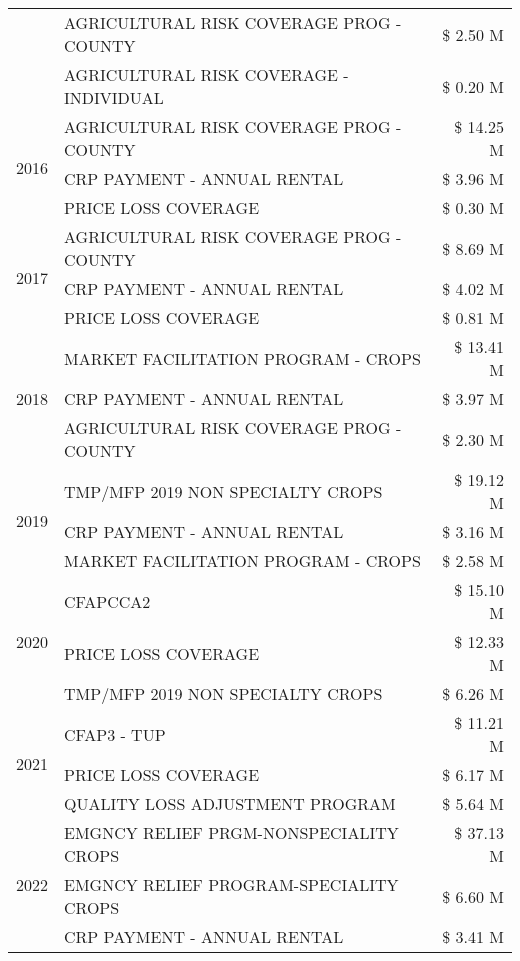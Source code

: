 \begin{tabular}{llr}
 & AGRICULTURAL RISK COVERAGE PROG - COUNTY & \$ 2.50 M \\
 & AGRICULTURAL RISK COVERAGE - INDIVIDUAL & \$ 0.20 M \\
\cline{1-3}
\multirow[t]{3}{*}{2016} & AGRICULTURAL RISK COVERAGE PROG - COUNTY & \$ 14.25 M \\
 & CRP PAYMENT - ANNUAL RENTAL & \$ 3.96 M \\
 & PRICE LOSS COVERAGE & \$ 0.30 M \\
\cline{1-3}
\multirow[t]{3}{*}{2017} & AGRICULTURAL RISK COVERAGE PROG - COUNTY & \$ 8.69 M \\
 & CRP PAYMENT - ANNUAL RENTAL & \$ 4.02 M \\
 & PRICE LOSS COVERAGE & \$ 0.81 M \\
\cline{1-3}
\multirow[t]{3}{*}{2018} & MARKET FACILITATION PROGRAM - CROPS & \$ 13.41 M \\
 & CRP PAYMENT - ANNUAL RENTAL & \$ 3.97 M \\
 & AGRICULTURAL RISK COVERAGE PROG - COUNTY & \$ 2.30 M \\
\cline{1-3}
\multirow[t]{3}{*}{2019} & TMP/MFP 2019 NON SPECIALTY CROPS & \$ 19.12 M \\
 & CRP PAYMENT - ANNUAL RENTAL & \$ 3.16 M \\
 & MARKET FACILITATION PROGRAM - CROPS & \$ 2.58 M \\
\cline{1-3}
\multirow[t]{3}{*}{2020} & CFAPCCA2 & \$ 15.10 M \\
 & PRICE LOSS COVERAGE & \$ 12.33 M \\
 & TMP/MFP 2019 NON SPECIALTY CROPS & \$ 6.26 M \\
\cline{1-3}
\multirow[t]{3}{*}{2021} & CFAP3 - TUP & \$ 11.21 M \\
 & PRICE LOSS COVERAGE & \$ 6.17 M \\
 & QUALITY LOSS ADJUSTMENT PROGRAM & \$ 5.64 M \\
\cline{1-3}
\multirow[t]{3}{*}{2022} & EMGNCY RELIEF PRGM-NONSPECIALITY CROPS & \$ 37.13 M \\
 & EMGNCY RELIEF PROGRAM-SPECIALITY CROPS & \$ 6.60 M \\
 & CRP PAYMENT - ANNUAL RENTAL & \$ 3.41 M \\
\cline{1-3}
\bottomrule
\end{tabular}
